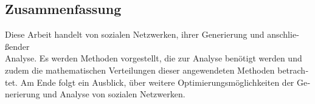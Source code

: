 \begingroup
\let\clearpage\relax
\let\cleardoublepage\relax
\let\cleardoublepage\relax

\begin{otherlanguage}{ngerman}
\chapter*{Zusammenfassung}
Diese Arbeit handelt von sozialen Netzwerken, ihrer Generierung und anschließender \\
Analyse. Es werden Methoden vorgestellt, die zur Analyse benötigt werden und zudem die mathematischen Verteilungen dieser angewendeten Methoden betrachtet. Am Ende folgt ein Ausblick, über weitere Optimierungsmöglichkeiten der Generierung und Analyse von sozialen Netzwerken. 
\end{otherlanguage}

\endgroup
\vfill
